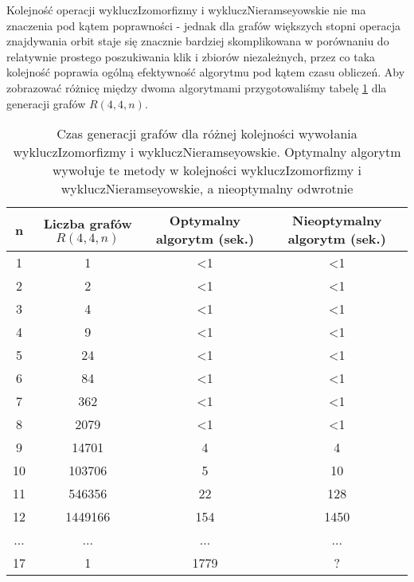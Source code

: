 Kolejność operacji wykluczIzomorfizmy i wykluczNieramseyowskie nie ma znaczenia pod kątem poprawności - jednak dla grafów większych stopni operacja znajdywania orbit staje się znacznie bardziej skomplikowana w porównaniu do relatywnie prostego poszukiwania klik i zbiorów niezależnych, przez co taka kolejność poprawia ogólną efektywność algorytmu pod kątem czasu obliczeń. Aby zobrazować różnicę między dwoma algorytmami przygotowaliśmy tabelę \ref{czasgen} dla generacji grafów $R(4,4,n)$.

\begin{table}[H]
 \begin{center}
 \begin{tabular}{|c c c c|} 
 \hline
 n & Liczba grafów $R(4,4,n)$ & Optymalny algorytm (sek.) & Nieoptymalny algorytm (sek.) \\ 
 \hline\hline
 1 & 1 & <1 & <1\\ 
 \hline
 2 & 2 & <1 & <1\\
 \hline
 3 & 4 & <1 & <1\\
 \hline
 4 & 9 & <1 & <1\\
 \hline
 5 & 24 & <1 & <1\\
 \hline
 6 & 84 & <1 & <1\\
 \hline
 7 & 362 & <1 & <1\\
 \hline
 8 & 2079 & <1 & <1\\
 \hline
 9 & 14701 & 4 & 4\\
 \hline
 10 & 103706 & 5 & 10\\
 \hline
 11 & 546356 & 22 & 128\\
 \hline
 12 & 1449166 & 154 & 1450\\
 \hline
 ... & ... & ... & ...\\
 \hline
  17 & 1 & 1779 & ?\\
 \hline
\end{tabular}
\end{center}
 \caption{Czas generacji grafów dla różnej kolejności wywołania wykluczIzomorfizmy i wykluczNieramseyowskie. Optymalny algorytm wywołuje te metody w kolejności wykluczIzomorfizmy i wykluczNieramseyowskie, a nieoptymalny odwrotnie}
 \label{czasgen}
 \end{table}

